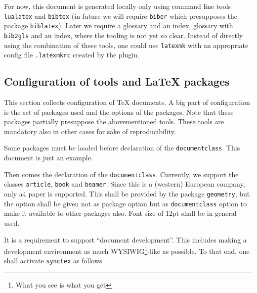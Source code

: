 \documentclass[a4paper,12pt]{article}
\begin{document}
For now, this document is generated locally 
only using command line tools \texttt{lualatex} and \texttt{bibtex} 
(in future we will require \texttt{biber} which presupposes the package \texttt{biblatex}). 
Later we require a glossary and an index, glossary with \texttt{bib2gls} 
and an index, where the tooling is not yet so clear. 
Instead of directly using the combination of these tools, 
one could use \texttt{latexmk} 
with an appropriate config file \texttt{.latexmkrc} created by the plugin. 

\subsection{Configuration of tools and \LaTeX{} packages}\label{subsec:toolConf}

This section collects configuration of \TeX{} documents. 
A big part of configuration is the set of packages used 
and the options of the packages. 
Note that these packages partially presuppose the abovementioned tools. 
These tools are mandatory also in other cases for sake of reproducibility. 

Some packages must be loaded before declaration of the \texttt{documentclass}. 
This document is just an example. 


Then comes the declaration of the \texttt{documentclass}. 
Currently, we support the classes \texttt{article}, \texttt{book} and \texttt{beamer}. 
Since this is a (western) European company, only a4 paper is supported. 
This shall be provided by the package \texttt{geometry}, 
but the option shall be given not as package option but as \texttt{documentclass} option 
to make it available to other packages also. 
Font size of 12pt shall be in general used. 


It is a requirement to support ``document development''. 
This includes making a development environment as much 
WYSIWIG\footnote{What you see is what you get}-like as possible. 
To that end, one shall activate \texttt{synctex} as follows 

\end{document}
